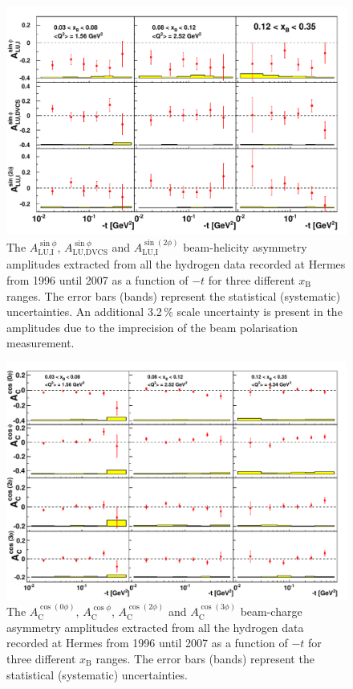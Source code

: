 \begin{figure}
 \begin{center}
 \includegraphics[width=15cm]{bsadvcsplots_tc_xbjrange_eml_par13_bin6_9607_pic_cluster}
  \caption{The $A_{\textrm{LU,I}}^{\sin\phi}$, $A_{\textrm{LU,DVCS}}^{\sin\phi}$ and
$A_{\textrm{LU,I}}^{\sin(2\phi)}$ beam-helicity asymmetry amplitudes extracted from all the hydrogen data recorded at H{\sc ermes} from 1996 until 2007 as a function of $-t$ for three different $x_{\textrm{B}}$ ranges. The error bars (bands) represent the statistical (systematic) uncertainties. An additional 3.2\,\% scale uncertainty is present in the amplitudes due to the imprecision of the beam polarisation measurement.}
  \label{bsa_xbjrange2}
 \end{center}
\end{figure}

\begin{figure}
  \begin{center}
    \includegraphics[width=15cm]{bcaplots_tc_xbjrange_eml_par13_bin6_9607_pic_cluster}
    \caption{The $A_{\textrm{C}}^{\cos(0\phi)}$, $A_{\textrm{C}}^{\cos\phi}$, $A_{\textrm{C}}^{\cos(2\phi)}$ and $A_{\textrm{C}}^{\cos(3\phi)}$ beam-charge asymmetry amplitudes extracted from all the hydrogen data recorded at H{\sc ermes} from 1996 until 2007 as a function of $-t$ for three different $x_{\textrm{B}}$ ranges. The error bars (bands) represent the statistical (systematic) uncertainties.}
  \label{bca_xbjrange2}
 \end{center}
\end{figure}


